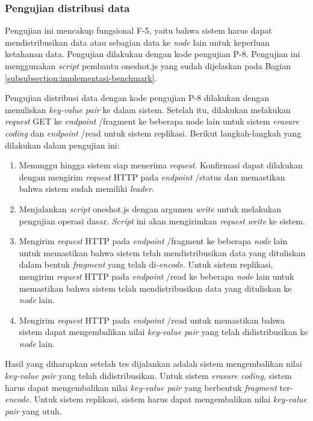 \subsubsection{Pengujian distribusi data}
\label{subsubsection:pengujian-distribusi-data}

Pengujian ini mencakup fungsional F-5, yaitu bahwa sistem harus dapat mendistribusikan data atau sebagian data ke \textit{node} lain untuk keperluan ketahanan data. Pengujian dilakukan dengan kode pengujian P-8. Pengujian ini menggunakan \textit{script} pembantu oneshot.js yang sudah dijelaskan pada Bagian \ref{subsubsection:implementasi-benchmark}. 

Pengujian distribusi data dengan kode pengujian P-8 dilakukan dengan menuliskan \textit{key-value pair} ke dalam sistem. Setelah itu, dilakukan melakukan \textit{request} GET ke \textit{endpoint} /fragment ke beberapa node lain untuk sistem \textit{erasure coding} dan \textit{endpoint} /read untuk sistem replikasi. Berikut langkah-langkah yang dilakukan dalam pengujian ini:

\begin{enumerate}
    \item Menunggu hingga sistem siap menerima \textit{request}. Konfirmasi dapat dilakukan dengan mengirim \textit{request} HTTP pada \textit{endpoint} /status dan memastikan bahwa sistem sudah memiliki \textit{leader}.
    \item Menjalankan \textit{script} oneshot.js dengan argumen \textit{write} untuk melakukan pengujian operasi dasar. \textit{Script} ini akan mengirimkan \textit{request} \textit{write} ke sistem.
    \item Mengirim \textit{request} HTTP pada \textit{endpoint} /fragment ke beberapa \textit{node} lain untuk memastikan bahwa sistem telah mendistribusikan data yang dituliskan dalam bentuk \textit{fragment} yang telah di-\textit{encode}. Untuk sistem replikasi, mengirim \textit{request} HTTP pada \textit{endpoint} /read ke beberapa \textit{node} lain untuk memastikan bahwa sistem telah mendistribusikan data yang dituliskan ke \textit{node} lain.
    \item Mengirim \textit{request} HTTP pada \textit{endpoint} /read untuk memastikan bahwa sistem dapat mengembalikan nilai \textit{key-value pair} yang telah didistribusikan ke \textit{node} lain.
\end{enumerate}

Hasil yang diharapkan setelah tes dijalankan adalah sistem mengembalikan nilai \textit{key-value pair} yang telah didistribusikan. Untuk sistem \textit{erasure coding}, sistem harus dapat mengembalikan nilai \textit{key-value pair} yang berbentuk \textit{fragment} ter-\textit{encode}. Untuk sistem replikasi, sistem harus dapat mengembalikan nilai \textit{key-value pair} yang utuh.